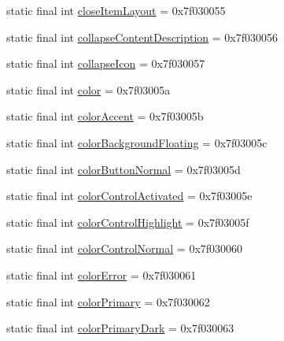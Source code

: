 \begin{DoxyCompactItemize}
\item 
static final int \mbox{\hyperlink{classcom_1_1synnapps_1_1carouselview_1_1_r_1_1attr_a2ed07a8722a1d7cd447fadbee19fe4ba}{close\+Item\+Layout}} = 0x7f030055
\item 
static final int \mbox{\hyperlink{classcom_1_1synnapps_1_1carouselview_1_1_r_1_1attr_a2dee90ed44491578aa45870d64c2db2b}{collapse\+Content\+Description}} = 0x7f030056
\item 
static final int \mbox{\hyperlink{classcom_1_1synnapps_1_1carouselview_1_1_r_1_1attr_add2929dfd0b5cd0bc9c6f0f5f7881791}{collapse\+Icon}} = 0x7f030057
\item 
static final int \mbox{\hyperlink{classcom_1_1synnapps_1_1carouselview_1_1_r_1_1attr_aa494e8f45fd1fa2472f36058146c56d6}{color}} = 0x7f03005a
\item 
static final int \mbox{\hyperlink{classcom_1_1synnapps_1_1carouselview_1_1_r_1_1attr_a2cc346b8950865e847ddb29834a1d9a0}{color\+Accent}} = 0x7f03005b
\item 
static final int \mbox{\hyperlink{classcom_1_1synnapps_1_1carouselview_1_1_r_1_1attr_af0aa81657f89828546465c28cdd09f20}{color\+Background\+Floating}} = 0x7f03005c
\item 
static final int \mbox{\hyperlink{classcom_1_1synnapps_1_1carouselview_1_1_r_1_1attr_af1f2906f7a8eb59084f718035ecf06b5}{color\+Button\+Normal}} = 0x7f03005d
\item 
static final int \mbox{\hyperlink{classcom_1_1synnapps_1_1carouselview_1_1_r_1_1attr_a9dd8ab3fe3f86c21acd80e5740e65bda}{color\+Control\+Activated}} = 0x7f03005e
\item 
static final int \mbox{\hyperlink{classcom_1_1synnapps_1_1carouselview_1_1_r_1_1attr_a08f6810af6d0d78990a60786a297425b}{color\+Control\+Highlight}} = 0x7f03005f
\item 
static final int \mbox{\hyperlink{classcom_1_1synnapps_1_1carouselview_1_1_r_1_1attr_a1baf2ad6a1b35fd4c334bbab304182cb}{color\+Control\+Normal}} = 0x7f030060
\item 
static final int \mbox{\hyperlink{classcom_1_1synnapps_1_1carouselview_1_1_r_1_1attr_a4032813325d122da9269cd0535cc5574}{color\+Error}} = 0x7f030061
\item 
static final int \mbox{\hyperlink{classcom_1_1synnapps_1_1carouselview_1_1_r_1_1attr_a1c862fcdadabacec62c9f77642e9cb41}{color\+Primary}} = 0x7f030062
\item 
static final int \mbox{\hyperlink{classcom_1_1synnapps_1_1carouselview_1_1_r_1_1attr_aad9aa893b204f645c379008b044f22be}{color\+Primary\+Dark}} = 0x7f030063

\end{DoxyCompactItemize}
